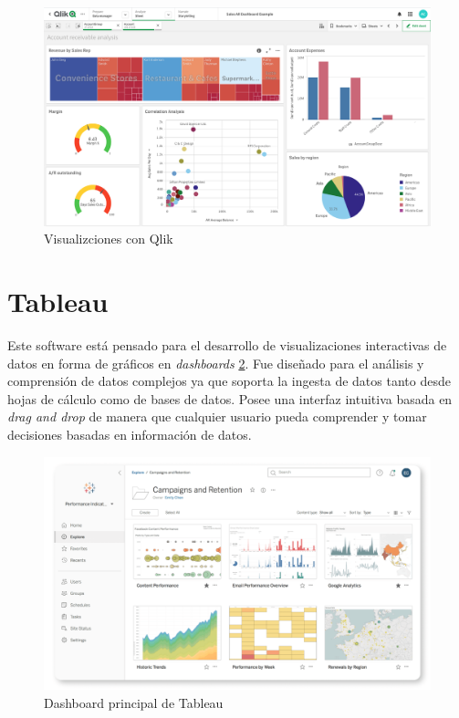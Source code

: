 \begin{figure}
    \centering
    \includegraphics[width=1\linewidth]{img/qlik.png}
    \caption{Visualizciones con Qlik \cite{Qlik} }
    \label{fig:qlik}
\end{figure}

\paragraph{            }
\paragraph{            }

\section{Tableau}
Este software está pensado para el desarrollo de visualizaciones interactivas  de datos en forma de gráficos en \textit{dashboards} \ref{fig:tableau}. Fue diseñado para el análisis y comprensión de datos complejos ya que soporta la ingesta de datos tanto desde hojas de cálculo como de bases de datos. Posee una interfaz intuitiva basada en \textit{drag and drop} de manera que cualquier usuario pueda comprender y tomar decisiones basadas en información de datos.

\begin{figure}
    \centering
    \includegraphics[width=1\linewidth]{img/tableau.png}
    \caption{Dashboard principal de Tableau \cite{tableau}}
    \label{fig:tableau}
\end{figure}
